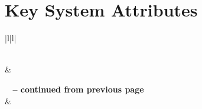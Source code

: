 \section{Key System Attributes}
\label{lab:sec_Bspec_KSA}

{%
\singlespace
\renewcommand{\baselinestretch}{1.0}%
\renewcommand*{\arraystretch}{1.0}%

\newlength{\KsaVspace}
\setlength{\KsaVspace}{4 pt}

\newlength{\KsaRightColumnWidth}
\setlength{\KsaRightColumnWidth}{4.5in}%
	
\begin{center}

\begin{longtable}[H]{|l|l|} %
\caption{Key System Attribute Specifications} \\

\hline \hline
{} & 
 \\
\hline \hline 
\endfirsthead

%
{{\bfseries \tablename\ \thetable{} -- continued from previous page}} \\
\hline \hline 
{}  
& 
 \\
\hline \hline 
\endhead

\hline \hline {} \\ \hline \hline
\endfoot

\hline \hline
\endlastfoot




\end{longtable}
\end{center}
}%

